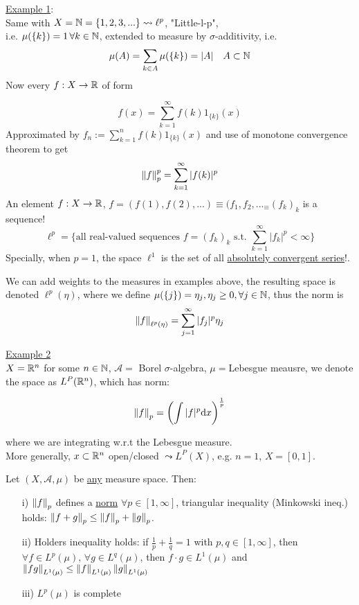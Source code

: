 \documentclass{article}
\begin{document}
\underline{Example 1}:\\
Same with $X=\mathbb{N}=\{1,2,3,...\}\mathrel{\leadsto} \ell^p$, "Little-l-p",\\
i.e. $\mu(\{k\})=1\,\forall k\in\mathbb{N}$, extended to measure by $\sigma$-additivity, i.e.
$$
	\mu(A)=\sum_{k\in A} \mu(\{k\})=|A|\quad A\subset \mathbb{N}
$$
Now every $f:X\to \mathbb{R} $ of form

$$f(x)=\sum_{k=1}^\infty f(k)1_{\{k\}}(x)$$
Approximated by $f_n\mathrel:=\sum_{k=1}^n f(k)1_{\{k\}}(x)$ and use of monotone convergence theorem to get
$$\left\|{f}\right\|_p^p=\sum_{k=1}^\infty |f(k)|^p$$
An element $f:X\to \mathbb{R}$, $f=(f(1),f(2),...)\equiv(f_1,f_2,..._\equiv(f_k)_k$ is a sequence!
$$\ell^p=
	\{
	\text{all real-valued sequences }
	f=(f_k)_k
	\text{ s.t. }
	\sum_{k=1}^\infty|f_k|^p<\infty
	\}$$
Specially, when $p=1$, the space $\ell^1$ is the set of all \underline{absolutely convergent series}!.
\begin{remark}
We can add weights to the measures in examples above, the resulting space is denoted $\ell^p(\eta)$, where we define 
$\mu(\{j\})=\eta_j, \eta_j \geq 0, \forall j\in\mathbb{N}$, thus the norm is $$\left\|{f}\right\|_{\ell^p(\eta)}=\sum_{j=1}^\infty|f_j|^p\eta_j
$$
\end{remark}

\underline{Example 2}\\
$X=\mathbb{R}^n$ for some $n\in\mathbb{N}$, $\mathcal{A}=$ Borel $\sigma$-algebra, $\mu=$Lebesgue meausre, we denote the space as $L^P(\mathbb{R}^n)$, which has norm:  

$$\left\|{f}\right\|_p=\left(\int|f|^p{\rm d}x\right)^\frac{1}{p}$$  

where we are integrating w.r.t the Lebesgue measure. \\  

More generally, $x\subset \mathbb{R}^n$ open/closed $\mathrel{\leadsto} L^P(X)$, e.g. $n=1$, $X=[0,1]$.



\begin{theorem}
	Let $(X,\mathcal{A},\mu)$ be {\underline {any}} measure space. Then:
	\begin{itemize}
		\item [i)] $\left\|{f}\right\|_p$ defines a \underline{norm} $\forall p\in[1,\infty]$, triangular inequality (Minkowski ineq.) holds: $\left\|{f+g}\right\|_p\leq\left\|{f}\right\|_p+\left\|{g}\right\|_p$.
		\item [ii)] Holders inequality holds: if $\frac{1}{p}+\frac{1}{q}=1$ with $p,q\in[1,\infty]$, then $\forall f\in L^p(\mu),\,\forall g\in L^q(\mu)$, then $f\cdot g\in L^1(\mu)$ and $\left\|{fg}\right\|_{L^1(\mu)}\leq\left\|{f}\right\|_{L^1(\mu)}\left\|{g}\right\|_{L^1(\mu)}$
		\item [iii)] $L^p(\mu)$ is complete
	\end{itemize}
\end{theorem}
\end{document}
